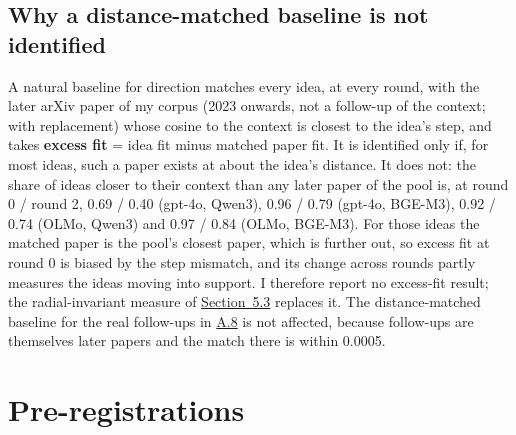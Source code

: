 \documentclass[
  10pt,
]{article}
\begin{document}
\subsection{Why a distance-matched baseline is not identified}\label{app:A.9}

A natural baseline for direction matches
every idea, at every round, with the
later arXiv paper of my corpus (2023
onwards, not a follow-up of the context;
with replacement) whose cosine to the
context is closest to the idea's step,
and takes \textbf{excess fit} = idea fit
minus matched paper fit. It is
identified only if, for most ideas, such
a paper exists at about the idea's
distance. It does not: the share of
ideas closer to their context than any
later paper of the pool is, at round 0 /
round 2, 0.69 / 0.40 (gpt-4o, Qwen3),
0.96 / 0.79 (gpt-4o, BGE-M3), 0.92 /
0.74 (OLMo, Qwen3) and 0.97 / 0.84
(OLMo, BGE-M3). For those ideas the
matched paper is the pool's closest
paper, which is further out, so excess
fit at round 0 is biased by the step
mismatch, and its change across rounds
partly measures the ideas moving into
support. I therefore report no
excess-fit result; the radial-invariant
measure of
\hyperref[sec:5.3]{Section~5.3} replaces
it. The distance-matched baseline for
the real follow-ups in
\hyperref[app:A.8]{A.8} is not affected,
because follow-ups are themselves later
papers and the match there is within
0.0005.

\section{Pre-registrations}\label{app:B}
\end{document}
